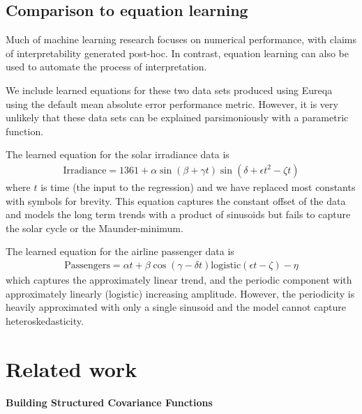 \documentclass{article}
\begin{document}
\subsection{Comparison to equation learning}

Much of machine learning research focuses on numerical performance, with claims of interpretability generated post-hoc.
In contrast, equation learning \citep{Schmidt2009b} can also be used to automate the process of interpretation.

We include learned equations for these two data sets produced using Eureqa \citep{Eureqa} using the default mean absolute error performance metric\footnotemark.
However, it is very unlikely that these data sets can be explained parsimoniously with a parametric function.

The learned equation for the solar irradiance data is
\begin{align*}
\textrm{Irradiance} = 1361 + \alpha\sin(\beta + \gamma t)\sin(\delta + \epsilon t^2 - \zeta t)
\end{align*}
where $t$ is time (the input to the regression) and we have replaced most constants with symbols for brevity.
This equation captures the constant offset of the data and models the long term trends with a product of sinusoids but fails to capture the solar cycle or the Maunder-minimum.

The learned equation for the airline passenger data is
\begin{align*}
\textrm{Passengers} = \alpha t + \beta\cos(\gamma - \delta t)\textrm{logistic}(\epsilon t - \zeta) - \eta
\end{align*}
which captures the approximately linear trend, and the periodic component with approximately linearly (logistic) increasing amplitude.
However, the periodicity is heavily approximated with only a single sinusoid and the model cannot capture heteroskedasticity.

\section{Related work}

\paragraph{Building Structured Covariance Functions}
\end{document}
